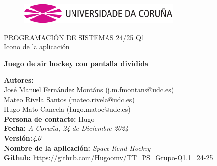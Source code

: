 \documentclass[a4paper,openright,12pt]{article}
\begin{document}
\begin{titlepage}

\begin{center}
\vspace*{-1in}
\begin{figure}[htb]
\begin{center}
\includegraphics[width=8cm]{udc.eps}
\end{center}
\end{figure}

\vspace*{1in}
PROGRAMACIÓN DE SISTEMAS 24/25 Q1\\
Icono de la aplicación\\
\vspace*{1in}
\begin{Large}
\textbf{Juego de air hockey con pantalla dividida} \\
\end{Large}

\vspace*{3in}

\begin{large}
\raggedright
\textbf{Autores:}\\ José Manuel Fernández Montáns (j.m.fmontans@udc.es) \\
Mateo Rivela Santos (mateo.rivela@udc.es)\\
Hugo Mato Cancela (hugo.matoc@udc.es)\\
\textbf{Persona de contacto:} Hugo\\
\textbf{Fecha:}\textit{ A Coruña, 24 de Diciembre 2024}\\
\textbf{Versión:}\textit{4.0}\\
\textbf{Nombre de la aplicación:} \textit{Space Rend Hockey}\\
\textbf{Github:} \url{https://github.com/Hugoomv/TT_PS_Grupo-Q1.1_24-25}\\
\end{large}

\end{center}
\end{titlepage} 

\newpage

\end{document}
